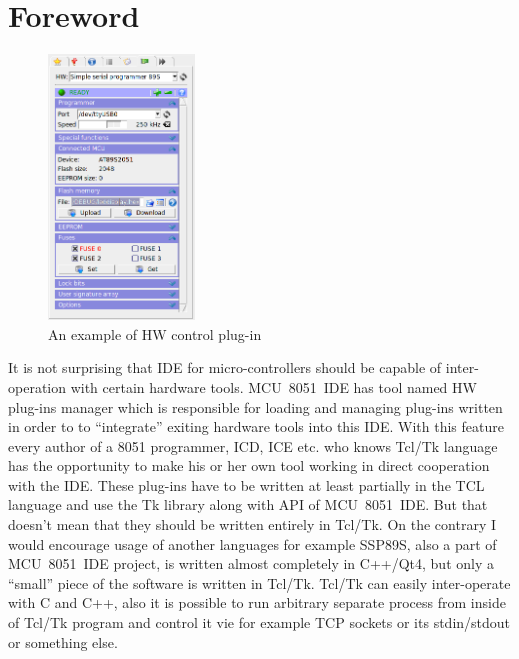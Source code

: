 \documentclass[a4paper,twoside,12pt]{book}
\begin{document}
	\section{Foreword}
		\begin{figure}
			\centering{}
			\includegraphics[width=110pt]{img/ssp89s_sceenshot.png}
			\caption{An example of HW control plug-in}
		\end{figure}
		It is not surprising that IDE for micro-controllers should be capable of inter-operation with certain hardware tools. MCU~8051~IDE has tool named HW plug-ins manager which is responsible for loading and managing plug-ins written in order to to ``integrate'' exiting hardware tools into this IDE. With this feature every author of a 8051 programmer, ICD, ICE etc. who knows Tcl/Tk language has the opportunity to make his or her own tool working in direct cooperation with the IDE. These plug-ins have to be written at least partially in the TCL language and use the Tk library along with API of MCU~8051~IDE. But that doesn't mean that they should be written entirely in Tcl/Tk. On the contrary I would encourage usage of another languages for example SSP89S, also a part of MCU~8051~IDE project, is written almost completely in C++/Qt4, but only a ``small'' piece of the software is written in Tcl/Tk. Tcl/Tk can easily inter-operate with C and C++, also it is possible to run arbitrary separate process from inside of
Tcl/Tk program and control it vie for example TCP sockets or its stdin/stdout or something else.
\end{document}
